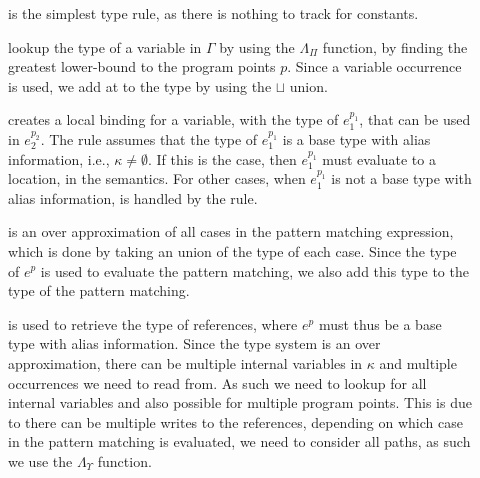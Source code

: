 \documentclass[../../master.tex]{subfiles}
\begin{document}
\begin{description}
	\item[] is the simplest type rule, as there is nothing to track for constants.

	\item[] lookup the type of a variable in $\Gamma$ by using the $\Lambda_\Pi$ function, by finding the greatest lower-bound to the program points $p$.
		Since a variable occurrence is used, we add at to the type by using the $\sqcup$ union.

	\item[] creates a local binding for a variable, with the type of $e_1^{p_1}$, that can be used in $e_2^{p_2}$.
		The  rule assumes that the type of $e_1^{p_1}$ is a base type with alias information, i.e., $\kappa\neq\emptyset$.
		If this is the case, then $e_1^{p_1}$ must evaluate to a location, in the semantics.
		For other cases, when $e_1^{p_1}$ is not a base type with alias information, is handled by the  rule.

	\item[] is an over approximation of all cases in the pattern matching expression, which is done by taking an union of the type of each case.
		Since the type of $e^p$ is used to evaluate the pattern matching, we also add this type to the type of the pattern matching.


	\item[] is used to retrieve the type of references, where $e^p$ must thus be a base type with alias information.
		Since the type system is an over approximation, there can be multiple internal variables in $\kappa$ and multiple occurrences we need to read from.
		As such we need to lookup for all internal variables and also possible for multiple program points.
		This is due to there can be multiple writes to the references, depending on which case in the pattern matching is evaluated, we need to consider all paths, as such we use the $\Lambda_\Upsilon$ function.
\end{description}
\end{document}
